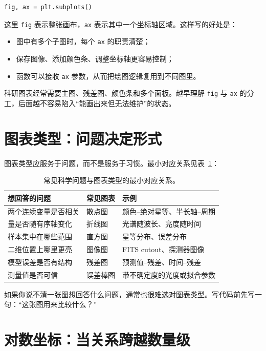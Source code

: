 \begin{lstlisting}[style=pythonstyle]
fig, ax = plt.subplots()
\end{lstlisting}

这里 \texttt{fig} 表示整张画布，\texttt{ax} 表示其中一个坐标轴区域。这样写的好处是：

\begin{itemize}
    \item 图中有多个子图时，每个 \texttt{ax} 的职责清楚；
    \item 保存图像、添加颜色条、调整坐标轴更容易控制；
    \item 函数可以接收 \texttt{ax} 参数，从而把绘图逻辑复用到不同图里。
\end{itemize}

科研图表经常需要主图、残差图、颜色条和多个面板。越早理解 \texttt{fig} 与 \texttt{ax} 的分工，后面越不容易陷入“能画出来但无法维护”的状态。

\section{图表类型：问题决定形式}

图表类型应服务于问题，而不是服务于习惯。最小对应关系见表~\ref{tab:ch08_plot_type_questions}：

\begin{table}[htbp]
\centering
\begin{tabular}{p{}p{}p{}}
\toprule
想回答的问题 & 常见图表 & 示例 \\
\midrule
两个连续变量是否相关 & 散点图 & 颜色--绝对星等、半长轴--周期 \\
量是否随有序轴变化 & 折线图 & 光谱随波长、亮度随时间 \\
样本集中在哪些范围 & 直方图 & 星等分布、误差分布 \\
二维位置上哪里更亮 & 图像图 & FITS cutout、探测器图像 \\
模型误差是否有结构 & 残差图 & 预测值--残差、时间--残差 \\
测量值是否可信 & 误差棒图 & 带不确定度的光度或拟合参数 \\
\bottomrule
\end{tabular}
\caption{常见科学问题与图表类型的最小对应关系。}
\label{tab:ch08_plot_type_questions}
\end{table}

如果你说不清一张图想回答什么问题，通常也很难选对图表类型。写代码前先写一句：“这张图用来比较什么？”

\section{对数坐标：当关系跨越数量级}

